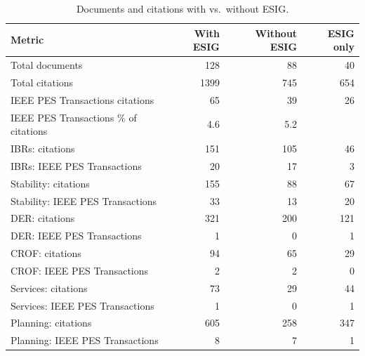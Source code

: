 \begin{table}[htbp]
\centering
\small
\begin{tabular}{lrrr}
\toprule
    Metric & With ESIG & Without ESIG & ESIG only \\
\midrule
    Total documents & 128 & 88 & 40 \\
    Total citations & 1399 & 745 & 654 \\
    IEEE PES Transactions citations & 65 & 39 & 26 \\
    IEEE PES Transactions \% of citations & 4.6 & 5.2 &  \\
\midrule
    IBRs: citations & 151 & 105 & 46 \\
    IBRs: IEEE PES Transactions & 20 & 17 & 3 \\
    Stability: citations & 155 & 88 & 67 \\
    Stability: IEEE PES Transactions & 33 & 13 & 20 \\
    DER: citations & 321 & 200 & 121 \\
    DER: IEEE PES Transactions & 1 & 0 & 1 \\
    CROF: citations & 94 & 65 & 29 \\
    CROF: IEEE PES Transactions & 2 & 2 & 0 \\
    Services: citations & 73 & 29 & 44 \\
    Services: IEEE PES Transactions & 1 & 0 & 1 \\
    Planning: citations & 605 & 258 & 347 \\
    Planning: IEEE PES Transactions & 8 & 7 & 1 \\
\bottomrule
\end{tabular}
\caption{Documents and citations with vs.\ without ESIG.}
\label{tab:entity_exclusion_comparison}
\end{table}
